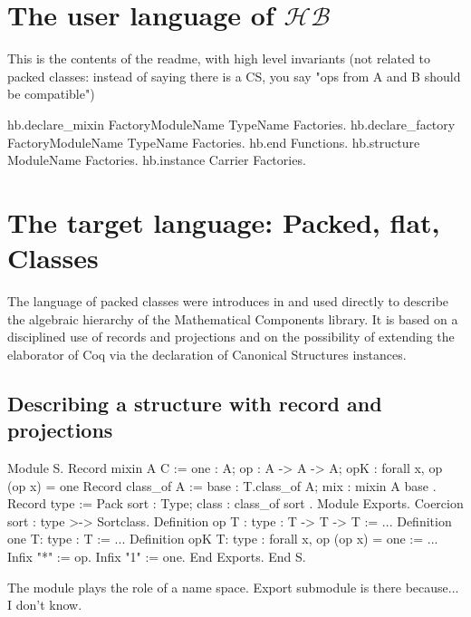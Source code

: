 \documentclass[a4paper,UKenglish,cleveref, autoref]{lipics-v2019}
\newcommand{\HB}{\ensuremath{\mathcal{HB}}}
\begin{document}
\section{The user language of \HB{}}
This is the contents of the readme, with high level invariants (not related to packed
classes: instead of saying there is a CS, you say "ops from A and B should be compatible")

\begin{coqcode}
hb.declare_mixin FactoryModuleName TypeName Factories.
hb.declare_factory FactoryModuleName TypeName Factories.
hb.end Functions.
hb.structure ModuleName Factories.
hb.instance Carrier Factories.
\end{coqcode}


\section{The target language: Packed, flat, Classes}
The language of packed classes were introduces in
\cite{DBLP:conf/tphol/GarillotGMR09} and used directly to describe the
algebraic hierarchy of the Mathematical Components library.
It is based on a disciplined use of records and projections and
on the possibility of extending the elaborator of Coq
via the declaration of Canonical Structures instances.

\subsection{Describing a structure with record and projections}

\begin{coqcode}
Module S.
  Record mixin A C := {
    one : A;
    op : A -> A -> A;
    opK : forall x, op (op x) = one
  }
  Record class_of A := {
    base : T.class_of A;
    mix  : mixin A base
  }.
  Record type := Pack {
    sort : Type;
    class : class_of sort
  }.
  Module Exports.
    Coercion sort : type >-> Sortclass.
    Definition op {T : type} : T -> T -> T := ...
    Definition one {T:  type} : T := ...
    Definition opK {T:  type} : forall x, op (op x) = one := ...
    Infix "*" := op.
    Infix "1" := one.
  End Exports.
End S.
\end{coqcode}

The module plays the role of a name space.
Export submodule is there because... I don't know.
\end{document}
